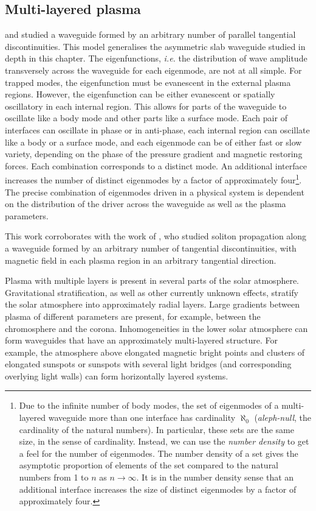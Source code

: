 \subsection{Multi-layered plasma}
\cite{shu_etal18} and \cite{all_etal19} studied a waveguide formed by an arbitrary number of parallel tangential discontinuities. This model generalises the asymmetric slab waveguide studied in depth in this chapter. The eigenfunctions, \textit{i.e.} the distribution of wave amplitude transversely across the waveguide for each eigenmode, are not at all simple. For trapped modes, the eigenfunction must be evanescent in the external plasma regions. However, the eigenfunction can be either evanescent or spatially oscillatory in each internal region. This allows for parts of the waveguide to oscillate like a body mode and other parts like a surface mode. Each pair of interfaces can oscillate in phase or in anti-phase, each internal region can oscillate like a body or a surface mode, and each eigenmode can be of either fast or slow variety, depending on the phase of the pressure gradient and magnetic restoring forces. Each combination corresponds to a distinct mode. An additional interface increases the number of distinct eigenmodes by a factor of approximately four\footnote{Due to the infinite number of body modes, the set of eigenmodes of a multi-layered waveguide more than one interface has cardinality $\aleph_0$ (\textit{aleph-null}, the cardinality of the natural numbers). In particular, these sets are the same size, in the sense of cardinality. Instead, we can use the \textit{number density} to get a feel for the number of eigenmodes. The number density of a set gives the asymptotic proportion of elements of the set compared to the natural numbers from 1 to $n$ as $n \to \infty$. It is in the number density sense that an additional interface increases the size of distinct eigenmodes by a factor of approximately four.}. The precise combination of eigenmodes driven in a physical system is dependent on the distribution of the driver across the waveguide as well as the plasma parameters.

This work corroborates with the work of \cite{rud92}, who studied soliton propagation along a waveguide formed by an arbitrary number of tangential discontinuities, with magnetic field in each plasma region in an arbitrary tangential direction.

Plasma with multiple layers is present in several parts of the solar atmosphere. Gravitational stratification, as well as other currently unknown effects, stratify the solar atmosphere into approximately radial layers. Large gradients between plasma of different parameters are present, for example, between the chromosphere and the corona. Inhomogeneities in the lower solar atmosphere can form waveguides that have an approximately multi-layered structure. For example, the atmosphere above elongated magnetic bright points and clusters of elongated sunspots or sunspots with several light bridges (and corresponding overlying light walls) can form horizontally layered systems.

